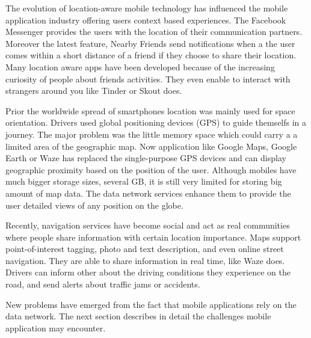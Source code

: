 The evolution of location-aware mobile technology has influenced the mobile
application industry offering users context based experiences. The Facebook
Messenger provides the users with the location of their communication partners.
Moreover the latest feature, Nearby Friends send notifications when a the user
comes within a short distance of a friend if they choose to share their
location. Many location aware apps have been developed because of the
increasing curiosity of people about friends activities. They even enable to
interact with strangers around you like Tinder or Skout does.

Prior the worldwide spread of smartphones location was mainly used for space
orientation. Drivers used global positioning devices (GPS) to guide themselfs
in a journey. The major problem was the little memory space which could carry a
a limited area of the geographic map. Now application like Google Maps, Google
Earth or Waze has replaced the single-purpose GPS devices and can display
geographic proximity based on the position of the user. Although mobiles have
much bigger storage sizes, several GB, it is still very limited for storing big
amount of map data. The data network services enhance them to provide the user
detailed views of any position on the globe.

Recently, navigation services have become social and act as real communities
where people share information with certain location importance. Maps support
point-of-interest tagging, photo and text description, and even online street
navigation. They are able to share information in real time, like
Waze does. Drivers can inform other about the driving conditions they experience
on the road, and send alerts about traffic jams or accidents.

New problems have emerged from the fact that mobile applications rely on the
data network. The next section describes in detail the challenges mobile
application may encounter.

